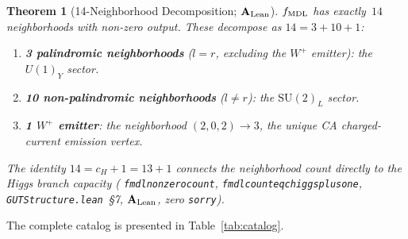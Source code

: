 \documentclass[11pt]{article}
\newtheorem{theorem}{Theorem}[section]
\theoremstyle{remark}
\newcommand{\cH}{c_H}
\newcommand{\lean}[1]{%
  \penalty-100
  \begingroup\def\_{\textunderscore\allowbreak}\texttt{#1}\endgroup}
\newcommand{\CatAL}{\ensuremath{\textbf{A}_{\rm Lean}}}
\begin{document}
\begin{theorem}[14-Neighborhood Decomposition; $\CatAL$]
\label{thm:14_decomposition}
$f_{\rm MDL}$ has exactly~$14$ neighborhoods with non-zero output.
These decompose as $14 = 3 + 10 + 1$:
\begin{enumerate}[nosep,leftmargin=1.5em]
\item \textbf{3 palindromic neighborhoods} ($l = r$, excluding the $W^+$
  emitter): the $U(1)_Y$ sector.
\item \textbf{10 non-palindromic neighborhoods} ($l \neq r$): the
  $\mathrm{SU}(2)_L$ sector.
\item \textbf{1 $W^+$ emitter}: the neighborhood $(2,0,2) \to 3$, the
  unique CA charged-current emission vertex.
\end{enumerate}
The identity $14 = \cH + 1 = 13 + 1$ connects the neighborhood count
directly to the Higgs branch capacity
(\lean{fmdl\_nonzero\_count\_14},
\lean{fmdl\_count\_eq\_chiggs\_plus\_one},
\texttt{GUTStructure.lean}~\S7, $\CatAL$, zero \texttt{sorry}).
\end{theorem}

The complete catalog is presented in Table~\ref{tab:catalog}.
\end{document}
